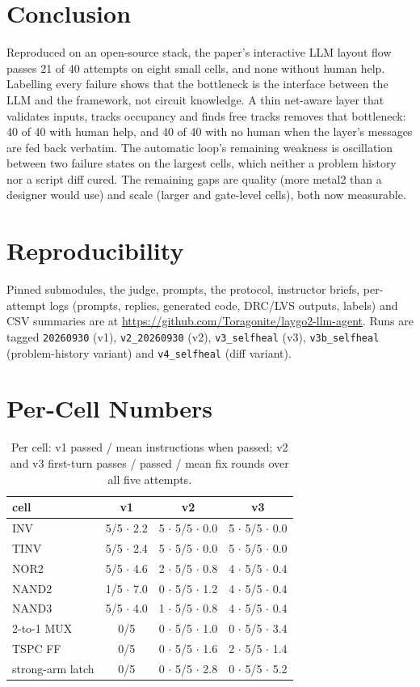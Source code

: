 \documentclass[conference]{IEEEtran}
\newcommand{\code}[1]{\texttt{#1}}
\begin{document}
\section{Conclusion}
Reproduced on an open-source stack, the paper's interactive LLM layout flow passes 21 of 40 attempts on eight small cells, and none without human help. Labelling every failure shows that the bottleneck is the interface between the LLM and the framework, not circuit knowledge. A thin net-aware layer that validates inputs, tracks occupancy and finds free tracks removes that bottleneck: 40 of 40 with human help, and 40 of 40 with no human when the layer's messages are fed back verbatim. The automatic loop's remaining weakness is oscillation between two failure states on the largest cells, which neither a problem history nor a script diff cured. The remaining gaps are quality (more metal2 than a designer would use) and scale (larger and gate-level cells), both now measurable.

\section*{Reproducibility}
Pinned submodules, the judge, prompts, the protocol, instructor briefs, per-attempt logs (prompts, replies, generated code, DRC/LVS outputs, labels) and CSV summaries are at \url{https://github.com/Toragonite/laygo2-llm-agent}. Runs are tagged \code{20260930} (v1), \code{v2\_20260930} (v2), \code{v3\_selfheal} (v3), \code{v3b\_selfheal} (problem-history variant) and \code{v4\_selfheal} (diff variant).


\appendices
\section{Per-Cell Numbers}
\begin{table}[H]
\caption{Per cell: v1 passed / mean instructions when passed; v2 and v3 first-turn passes / passed / mean fix rounds over all five attempts.}
\label{tab:percell}
\centering\footnotesize
\begin{tabular}{@{}lccc@{}}
\toprule
cell & v1 & v2 & v3 \\
\midrule
INV & 5/5 $\cdot$ 2.2 & 5 $\cdot$ 5/5 $\cdot$ 0.0 & 5 $\cdot$ 5/5 $\cdot$ 0.0 \\
TINV & 5/5 $\cdot$ 2.4 & 5 $\cdot$ 5/5 $\cdot$ 0.0 & 5 $\cdot$ 5/5 $\cdot$ 0.0 \\
NOR2 & 5/5 $\cdot$ 4.6 & 2 $\cdot$ 5/5 $\cdot$ 0.8 & 4 $\cdot$ 5/5 $\cdot$ 0.4 \\
NAND2 & 1/5 $\cdot$ 7.0 & 0 $\cdot$ 5/5 $\cdot$ 1.2 & 4 $\cdot$ 5/5 $\cdot$ 0.4 \\
NAND3 & 5/5 $\cdot$ 4.0 & 1 $\cdot$ 5/5 $\cdot$ 0.8 & 4 $\cdot$ 5/5 $\cdot$ 0.4 \\
2-to-1 MUX & 0/5 & 0 $\cdot$ 5/5 $\cdot$ 1.0 & 0 $\cdot$ 5/5 $\cdot$ 3.4 \\
TSPC FF & 0/5 & 0 $\cdot$ 5/5 $\cdot$ 1.6 & 2 $\cdot$ 5/5 $\cdot$ 1.4 \\
strong-arm latch & 0/5 & 0 $\cdot$ 5/5 $\cdot$ 2.8 & 0 $\cdot$ 5/5 $\cdot$ 5.2 \\
\bottomrule
\end{tabular}
\end{table}
\end{document}
